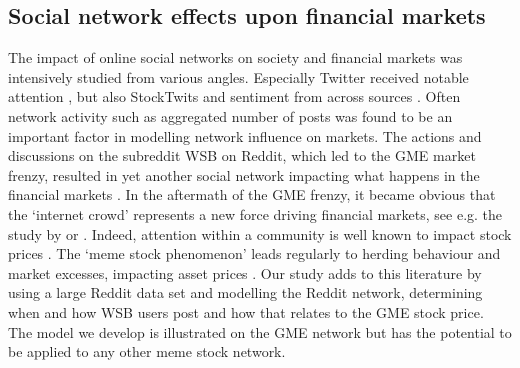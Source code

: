 
\subsection{Social network effects upon financial markets}
The impact of online social networks on society and financial markets was intensively studied from various angles. Especially Twitter received notable attention \citep{lehrer2021does, Gu2020,Behrendt2018, Yang2015}, but also StockTwits \citep{Audrino2020, chen2022sonic} and sentiment from across sources \parencite{audrino2024does, Gan2020, Jiao2020}. Often network activity such as aggregated number of posts was found to be an important factor in modelling network influence on markets. The actions and discussions on the subreddit WSB on Reddit, which led to the GME market frenzy, resulted in yet another social network impacting what happens in the financial markets \citep{Pedersen2022,Klein2022,Umar2021}. 
In the aftermath of the GME frenzy, it became obvious that the `internet crowd' represents a new force driving financial markets, see e.g. the study by \textcite{Pedersen2022} or \textcite{Yang2015}. Indeed, attention within a community is well known to impact stock prices \citep{Andrei2014}. The `meme stock phenomenon' \citep{Securities2021} leads regularly to herding behaviour and market excesses, impacting asset prices \citep{Aloosh2021, Costola2021}. Our study adds to this literature by using a large Reddit data set and modelling the Reddit network, determining when and how WSB users post and how that relates to the GME stock price. The model we develop is illustrated on the GME network but has the potential to be applied to any other meme stock network. 


